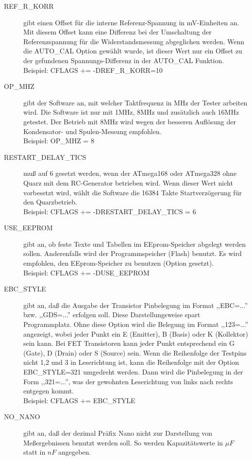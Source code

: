 \begin{description}
  \item[REF\_R\_KORR] gibt einen Offset für die interne Referenz-Spannung in mV-Einheiten an.
Mit diesem Offset kann eine Differenz bei der Umschaltung der Referenzspannung für die Widerstandsmessung abgeglichen werden.
Wenn die AUTO\_CAL Option gewählt wurde, ist dieser Wert nur ein Offset zu der gefundenen Spannungs-Differenz in der
AUTO\_CAL Funktion.\\
Beispiel: CFLAGS += -DREF\_R\_KORR=10
  \item[OP\_MHZ] gibt der Software an, mit welcher Taktfrequenz in MHz der Tester arbeiten wird.
Die Software ist nur mit 1MHz, 8MHz und zusätzlich auch 16MHz getestet. Der Betrieb mit 8MHz wird wegen der besseren Auflösung der
Kondensator- und Spulen-Messung empfohlen.\\
Beispiel: OP\_MHZ = 8
  \item[RESTART\_DELAY\_TICS] muß auf 6 gesetzt werden, wenn der ATmega168 oder ATmega328 ohne Quarz mit dem
RC-Generator betrieben wird. Wenn dieser Wert nicht vorbesetzt wird, wählt die Software die 16384 Takte Startverzögerung für
den Quarzbetrieb.\\
Beispiel: CFLAGS += -DRESTART\_DELAY\_TICS = 6
  \item[USE\_EEPROM] gibt an, ob feste Texte und Tabellen im EEprom-Speicher abgelegt werden sollen.
Anderenfalls wird der Programmspeicher (Flash) benutzt.
Es wird empfohlen, den EEprom-Speicher zu benutzen (Option gesetzt).\\
Beispiel: CFLAGS += -DUSE\_EEPROM
  \item[EBC\_STYLE] gibt an, daß die Ausgabe der Transistor Pinbelegung im Format ,,EBC=...'' bzw. ,,GDS=...'' erfolgen soll.
Diese Darstellungsweise spart Programmplatz. Ohne diese Option wird die Belegung im Format ,,123=...'' angezeigt, wobei
jeder Punkt ein E (Emitter), B (Basis) oder K (Kollektor) sein kann.
Bei FET Transistoren kann jeder Punkt entsprechend ein G (Gate), D (Drain) oder S (Source) sein.
Wenn die Reihenfolge der Testpins nicht 1,2 und 3 in Leserichtung ist, kann die Reihenfolge mit der Option EBC\_STYLE=321 
umgedreht werden. Dann wird die Pinbelegung in der Form ,,321=...'', was der gewohnten Leserichtung von links nach rechts
entgegen kommt.\\
Beispiel: CFLAGS += EBC\_STYLE
  \item[NO\_NANO] gibt an, daß der dezimal Präfix Nano nicht zur Darstellung von Meßergebnissen benutzt werden soll.
So werden Kapazitätswerte in \(\mu F\) statt in \(nF\) angegeben.\\

\end{description}
